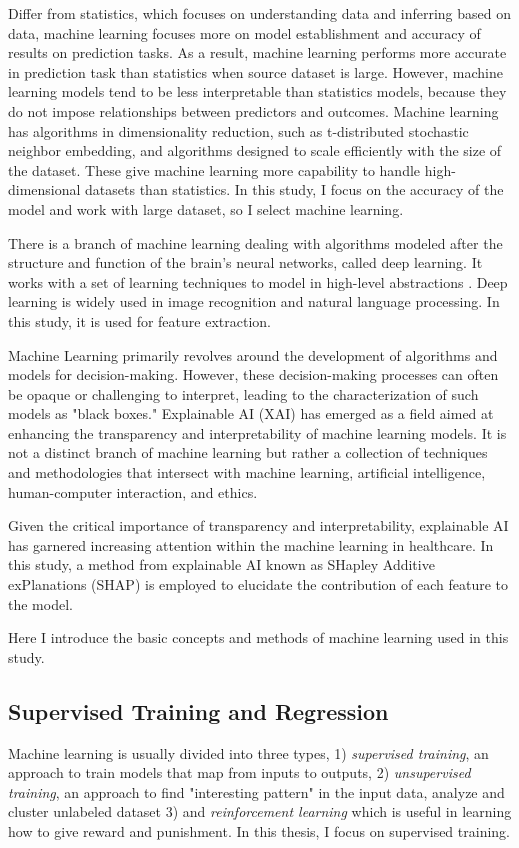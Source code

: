 \documentclass[12pt,a4paper,english
]{tunithesis}
\begin{document}
Differ from statistics, which focuses on understanding data and inferring based on data, machine learning focuses more on model establishment and accuracy of results on prediction tasks. As a result, machine learning performs more accurate in prediction task than statistics when source dataset is large. However, machine learning models tend to be less interpretable than statistics models, because they do not impose relationships between predictors and outcomes. Machine learning has algorithms in dimensionality reduction, such as t-distributed stochastic neighbor embedding, and algorithms designed to scale efficiently with the size of the dataset. These give machine learning more capability to handle high-dimensional datasets than statistics. \parencite{Bzdok2018, Rajula2020, turin2020} In this study, I focus on the accuracy of the model and work with large dataset, so I select machine learning.

There is a branch of machine learning dealing with algorithms modeled after the structure and function of the brain's neural networks, called deep learning. It works with a set of learning techniques to model in high-level abstractions \parencite{kevin2012}. Deep learning is widely used in image recognition and natural language processing. In this study, it is used for feature extraction.

Machine Learning primarily revolves around the development of algorithms and models for decision-making. However, these decision-making processes can often be opaque or challenging to interpret, leading to the characterization of such models as "black boxes." Explainable AI (XAI) has emerged as a field aimed at enhancing the transparency and interpretability of machine learning models. It is not a distinct branch of machine learning but rather a collection of techniques and methodologies that intersect with machine learning, artificial intelligence, human-computer interaction, and ethics. \parencite{turri2022}

Given the critical importance of transparency and interpretability, explainable AI has garnered increasing attention within the machine learning in healthcare. In this study, a method from explainable AI known as SHapley Additive exPlanations (SHAP) \parencite{lundberg2017} is employed to elucidate the contribution of each feature to the model.

Here I introduce the basic concepts and methods of machine learning used in this study. 

\subsection{Supervised Training and Regression}
Machine learning is usually divided into three types, 1) \textit{supervised training}, an approach to train models that  map from inputs to outputs, 2) \textit{unsupervised training},  an approach to find "interesting pattern" in the input data, analyze and cluster unlabeled dataset 3) and \textit{reinforcement learning} which is useful in learning how to give reward and punishment. In this thesis, I focus on supervised training. \parencite{kevin2012, WANG2023}
\end{document}
